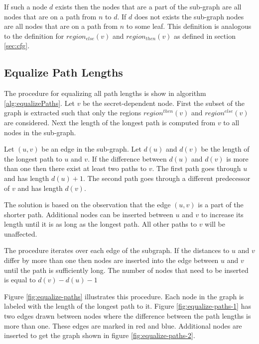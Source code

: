 If such a node $d$ exists then the nodes that are a part of the sub-graph are all nodes that are on a path from $n$ to $d$. If $d$ does not exists 
the sub-graph nodes are all nodes that are on a path from $n$ to some leaf. This definition is analogous to the definition for $region_{else}(v)$ and $region_{then}(v)$ as defined in section \ref{sec:cfg}.

\subsection{Equalize Path Lengths}

The procedure for equalizing all path lengths is show in algorithm \ref{alg:equalizePaths}.
Let $v$ be the secret-dependent node. 
First the subset of the graph is extracted such that 
only the regions $region^{then}(v)$ and $region^{else}(v)$ are considered.  
Next the length of the longest path is computed from $v$ to all nodes in the sub-graph. 

Let $(u, v)$ be an edge in the sub-graph. Let $d(u)$ and $d(v)$ be the length of the longest path to $u$ and $v$. If the difference between $d(u)$ and $d(v)$ is more than 
one then there exist at least two paths to $v$. The first path goes through $u$ and has length $d(u)+1$. The second path goes through a different predecessor of $v$ and has 
length $d(v)$. 

The solution is based on the observation that the edge $(u, v)$ is a part of the shorter path. 
Additional nodes can be inserted between $u$ and $v$ to increase its length until it is as long as the longest path. 
All other paths to $v$ will be unaffected. 

The procedure  iterates over each edge of the subgraph. If the distances to $u$ and $v$ differ by more than one then nodes are inserted 
into the edge between $u$ and $v$ until the path is sufficiently long. The number of nodes that need to be inserted is equal to $d(v) - d(u) - 1$

Figure \ref{fig:equalize-paths} illustrates this procedure.
Each node in the graph is labeled with the length of the longest path to it. 
Figure \ref{fig:equalize-paths-1} has two edges drawn between nodes where the difference between the path lengths is more than one. These edges are marked in red and blue. 
Additional nodes are inserted to get the graph shown in figure \ref{fig:equalize-paths-2}. 

